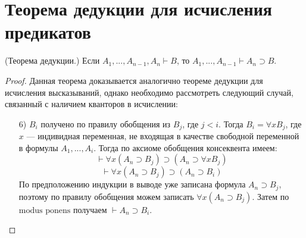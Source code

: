 \section{Теорема дедукции для исчисления предикатов}

\begin{theorem}
    (Теорема дедукции.) Если $A_1,...,A_{n-1},A_n \vdash B$, то $A_1,...,A_{n-1} \vdash A_n \supset B$.
\end{theorem}
\begin{proof}
    Данная теорема доказывается аналогично теореме дедукции для исчисления высказываний, однако необходимо рассмотреть следующий случай, связанный с наличием кванторов в исчислении:
    \begin{enumerate}
        \item[6)] $B_i$ получено по правилу обобщения из $B_j$, где $j<i$. Тогда $B_i=\forall x B_j$, где $x$ --- индивидная переменная, не входящая в качестве свободной переменной в формулы $A_1,...,A_i$. Тогда по аксиоме обобщения консеквента имеем:
        \begin{equation*}
            \vdash \forall x (A_n \supset B_j) \supset (A_n \supset \forall x B_j)
        \end{equation*}
        \begin{equation*}
            \vdash \forall x (A_n \supset B_j) \supset (A_n \supset B_i)
        \end{equation*}
        По предположению индукции в выводе уже записана формула $A_n \supset B_j$, поэтому по правилу обобщения можем записать $\forall x (A_n \supset B_j)$. Затем по $\text{modus ponens}$ получаем $\vdash A_n \supset B_i$. \qedhere
    \end{enumerate}
\end{proof}